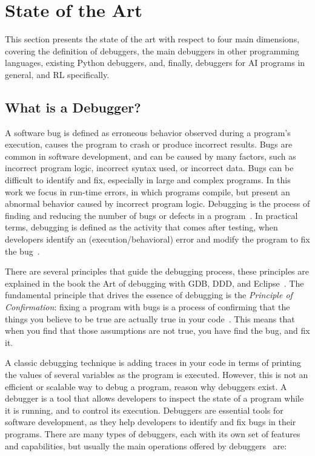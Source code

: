 
\section{State of the Art}
\label{sec:state_of_the_art}

This section presents the state of the art with respect to four main dimensions, covering the definition 
of debuggers, the main debuggers in other programming languages, existing Python debuggers, and, 
finally, debuggers for \ac{AI} programs in general, and \ac{RL} specifically.


\subsection{What is a Debugger?}
\label{sec:deb}

A software bug is defined as erroneous behavior observed during a program's execution, causes the 
program to crash or produce incorrect results. Bugs are common in software development, and can 
be caused by many factors, such as incorrect program logic, incorrect syntax used, or incorrect data. 
Bugs can be difficult to identify and fix, especially in large and complex programs. In this work we 
focus in run-time errors, in which programs compile, but present an abnormal behavior caused by 
incorrect program logic. Debugging is the process of finding and reducing the number of 
bugs or defects in a program~\cite{hindriks12}. In practical terms, debugging is defined as the 
activity that comes after testing, when developers identify an (execution/behavioral) error and modify
the program to fix the bug~\cite{mccauley08}. 

There are several principles that guide the debugging process, these principles are explained in the 
book the Art of debugging with \ac{GDB}, \ac{DDD}, and Eclipse~\cite{matloff08}. The fundamental 
principle that drives the essence of debugging is the \emph{Principle of Confirmation}: fixing a 
program with bugs is a process of confirming that the things you believe to be true are actually true in 
your code~\cite{matloff08}. This means that when you find that those assumptions are not true, you 
have find the bug, and fix it.

A classic debugging technique is adding traces in your code in terms of printing the values of several 
variables as the program is executed. However, this is not an efficient or scalable way to debug a 
program, reason why debuggers exist. A debugger is a tool that allows developers to inspect the 
state of a program while it is running, and to control its execution. Debuggers are essential tools for 
software development, as they help developers to identify and fix bugs in their programs. There are 
many types of debuggers, each with its own set of features and capabilities, but usually the main 
operations offered by debuggers~\cite{matloff08} are:

